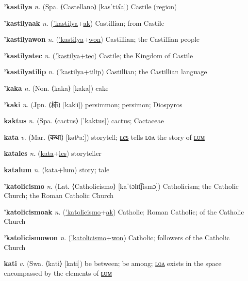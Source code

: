 \textbf{\hypertarget{'kastilya}{'kastilya}} \textit{n.} (Spa. ⟨Castellano⟩ [kasˈtiʎa])
Castile (region)

\textbf{\hypertarget{'kastilyaak}{'kastilyaak}} \textit{n.} (\hyperlink{'kastilya}{'kastilya}+\allowbreak \hyperlink{ak}{ak})
Castillian; from Castile

\textbf{\hypertarget{'kastilyawon}{'kastilyawon}} \textit{n.} (\hyperlink{'kastilya}{'kastilya}+\allowbreak \hyperlink{won}{won})
Castillian; the Castillian people

\textbf{\hypertarget{'kastilyatec}{'kastilyatec}} \textit{n.} (\hyperlink{'kastilya}{'kastilya}+\allowbreak \hyperlink{tec}{tec})
Castile; the Kingdom of Castile

\textbf{\hypertarget{'kastilyatilip}{'kastilyatilip}} \textit{n.} (\hyperlink{'kastilya}{'kastilya}+\allowbreak \hyperlink{tilip}{tilip})
Castillian; the Castillian language

\textbf{\hypertarget{'kaka}{'kaka}} \textit{n.} (Non. ⟨kaka⟩ [kaka])
cake

\textbf{\hypertarget{'kaki}{'kaki}} \textit{n.} (Jpn. ⟨{\japanese{}柿}⟩ [kakʲi])
persimmon; persimon; Diospyros

\textbf{\hypertarget{kaktus}{kaktus}} \textit{n.} (Spa. ⟨cactus⟩ [ˈkaktus])
cactus; Cactaceae

\textbf{\hypertarget{kata}{kata}} \textit{v.} (Mar. ⟨{\devanagari{}कथा}⟩ [kətʰaː])
storytell; \hyperlink{katales}{ʟєꜱ} tells ʟᴏᴧ the story of \hyperlink{katalum}{ʟᴜᴍ}

\textbf{\hypertarget{katales}{katales}} \textit{n.} (\hyperlink{kata}{kata}+\allowbreak \hyperlink{les}{les})
storyteller

\textbf{\hypertarget{katalum}{katalum}} \textit{n.} (\hyperlink{kata}{kata}+\allowbreak \hyperlink{lum}{lum})
story; tale

\textbf{\hypertarget{'katolicismo}{'katolicismo}} \textit{n.} (Lat. ⟨Catholicismo⟩ [kaˈtɔlɪt͡ʃismɔ])
Catholicism; the Catholic Church; the Roman Catholic Church

\textbf{\hypertarget{'katolicismoak}{'katolicismoak}} \textit{n.} (\hyperlink{'katolicismo}{'katolicismo}+\allowbreak \hyperlink{ak}{ak})
Catholic; Roman Catholic; of the Catholic Church

\textbf{\hypertarget{'katolicismowon}{'katolicismowon}} \textit{n.} (\hyperlink{'katolicismo}{'katolicismo}+\allowbreak \hyperlink{won}{won})
Catholic; followers of the Catholic Church

\textbf{\hypertarget{kati}{kati}} \textit{v.} (Swa. ⟨kati⟩ [kati])
be between; be among; \hyperlink{katilon}{ʟᴏᴧ} exists in the space encompassed by the elements of \hyperlink{katilum}{ʟᴜᴍ}

